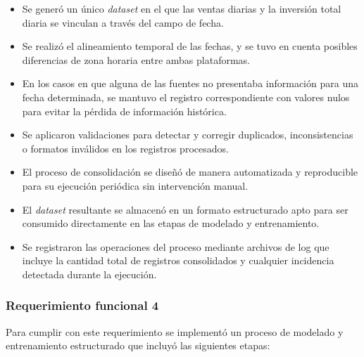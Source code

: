 \begin{itemize}
    \item Se generó un único \textit{dataset} en el que las ventas diarias y la inversión total diaria se vinculan a través del campo de fecha.
    \item Se realizó el alineamiento temporal de las fechas, y se tuvo en cuenta posibles diferencias de zona horaria entre ambas plataformas.
    \item En los casos en que alguna de las fuentes no presentaba información para una fecha determinada, se mantuvo el registro correspondiente con valores nulos para evitar la pérdida de información histórica.
    \item Se aplicaron validaciones para detectar y corregir duplicados, inconsistencias o formatos inválidos en los registros procesados.
    \item El proceso de consolidación se diseñó de manera automatizada y reproducible para su ejecución periódica sin intervención manual.
    \item El \textit{dataset} resultante se almacenó en un formato estructurado apto para ser consumido directamente en las etapas de modelado y entrenamiento.
    \item Se registraron las operaciones del proceso mediante archivos de log que incluye la cantidad total de registros consolidados y cualquier incidencia detectada durante la ejecución.
\end{itemize}



\subsubsection{Requerimiento funcional 4}


Para cumplir con este requerimiento se implementó un proceso de modelado y entrenamiento estructurado que incluyó las siguientes etapas:

